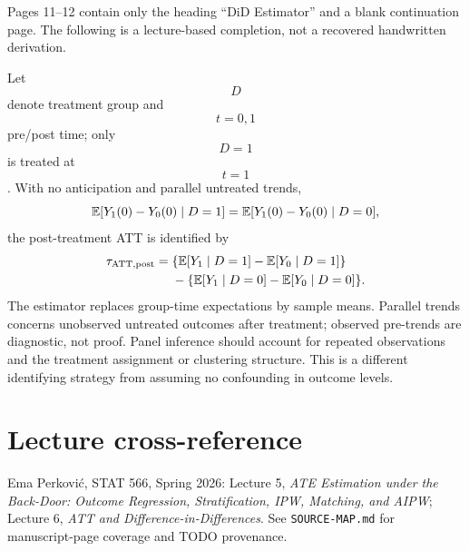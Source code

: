 Pages 11--12 contain only the heading ``DiD Estimator'' and a blank continuation page. The following is a lecture-based completion, not a recovered handwritten derivation.
\begin{supplement}
Let $$D$$ denote treatment group and $$t=0,1$$ pre/post time; only $$D=1$$ is treated at $$t=1$$. With no anticipation and parallel untreated trends,
\begin{equation}
\mathbb E[Y_1(0)-Y_0(0)\mid D=1]
=\mathbb E[Y_1(0)-Y_0(0)\mid D=0],
\end{equation}
the post-treatment ATT is identified by
\begin{align}
\tau_{\mathrm{ATT,post}}={}&\{\mathbb E[Y_1\mid D=1]-\mathbb E[Y_0\mid D=1]\}\\
&-\{\mathbb E[Y_1\mid D=0]-\mathbb E[Y_0\mid D=0]\}.
\end{align}
The estimator replaces group-time expectations by sample means. Parallel trends concerns unobserved untreated outcomes after treatment; observed pre-trends are diagnostic, not proof. Panel inference should account for repeated observations and the treatment assignment or clustering structure. This is a different identifying strategy from assuming no confounding in outcome levels.
\end{supplement}
\section*{Lecture cross-reference}
Ema Perkovi\'c, STAT 566, Spring 2026: Lecture 5, \emph{ATE Estimation under the Back-Door: Outcome Regression, Stratification, IPW, Matching, and AIPW}; Lecture 6, \emph{ATT and Difference-in-Differences}. See \texttt{SOURCE-MAP.md} for manuscript-page coverage and TODO provenance.
